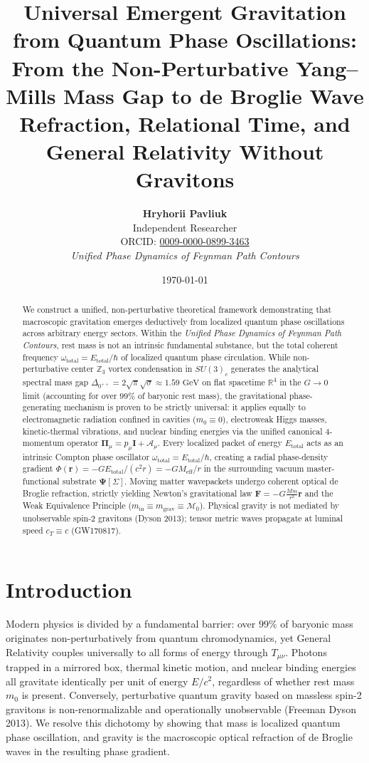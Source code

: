 \documentclass[11pt,a4paper]{article}
\title{\textbf{Universal Emergent Gravitation from Quantum Phase Oscillations: From the Non-Perturbative Yang--Mills Mass Gap to de Broglie Wave Refraction, Relational Time, and General Relativity Without Gravitons}}
\author{\textbf{Hryhorii Pavliuk} \\ Independent Researcher \\ ORCID: \href{https://orcid.org/0009-0000-0899-3463}{0009-0000-0899-3463} \\ \textit{Unified Phase Dynamics of Feynman Path Contours}}
\date{\today}
\begin{document}
\maketitle

\begin{abstract}
We construct a unified, non-perturbative theoretical framework demonstrating that macroscopic gravitation emerges deductively from localized quantum phase oscillations across arbitrary energy sectors. Within the \textit{Unified Phase Dynamics of Feynman Path Contours}, rest mass is not an intrinsic fundamental substance, but the total coherent frequency $\omega_{\text{total}} = E_{\text{total}}/\hbar$ of localized quantum phase circulation. While non-perturbative center $\mathbb{Z}_3$ vortex condensation in $SU(3)_c$ generates the analytical spectral mass gap $\Delta_{0^{++}} = 2\sqrt{\pi}\sqrt{\sigma} \approx 1.59\text{ GeV}$ on flat spacetime $\mathbb{R}^4$ in the $G \to 0$ limit (accounting for over $99\%$ of baryonic rest mass), the gravitational phase-generating mechanism is proven to be strictly universal: it applies equally to electromagnetic radiation confined in cavities ($m_0 \equiv 0$), electroweak Higgs masses, kinetic-thermal vibrations, and nuclear binding energies via the unified canonical 4-momentum operator $\mathbf{\Pi}_\mu = p_\mu \mathbf{I} + \mathbf{\mathcal{A}}_\mu$. Every localized packet of energy $E_{\text{total}}$ acts as an intrinsic Compton phase oscillator $\omega_{\text{total}} = E_{\text{total}}/\hbar$, creating a radial phase-density gradient $\Phi(\mathbf{r}) = -G E_{\text{total}} / (c^2 r) = -G M_{\text{eff}} / r$ in the surrounding vacuum master-functional substrate $\mathbf{\Psi}[\Sigma]$. Moving matter wavepackets undergo coherent optical de Broglie refraction, strictly yielding Newton's gravitational law $\mathbf{F} = -G\frac{M m}{r^2}\hat{\mathbf{r}}$ and the Weak Equivalence Principle ($m_{\text{in}} \equiv m_{\text{grav}} \equiv \mathcal{M}_0$). Physical gravity is not mediated by unobservable spin-2 gravitons (Dyson 2013); tensor metric waves propagate at luminal speed $c_T \equiv c$ (GW170817).
\end{abstract}

\section{Introduction}
Modern physics is divided by a fundamental barrier: over $99\%$ of baryonic mass originates non-perturbatively from quantum chromodynamics, yet General Relativity couples universally to all forms of energy through $T_{\mu\nu}$. Photons trapped in a mirrored box, thermal kinetic motion, and nuclear binding energies all gravitate identically per unit of energy $E/c^2$, regardless of whether rest mass $m_0$ is present. Conversely, perturbative quantum gravity based on massless spin-2 gravitons is non-renormalizable and operationally unobservable (Freeman Dyson 2013). We resolve this dichotomy by showing that mass is localized quantum phase oscillation, and gravity is the macroscopic optical refraction of de Broglie waves in the resulting phase gradient.
\end{document}
